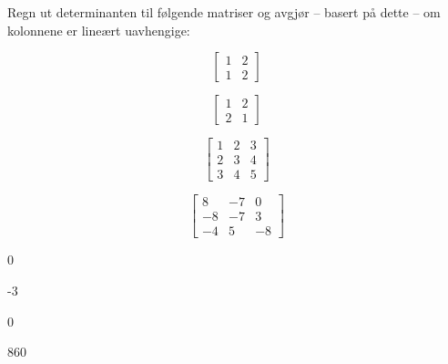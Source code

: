
\begin{oppgave}
Regn ut determinanten til følgende matriser og avgjør -- basert på dette -- om kolonnene er lineært uavhengige:
\begin{punkt}
$$\begin{bmatrix}
1 & 2\\
1 & 2
\end{bmatrix}$$
\end{punkt}

\begin{punkt}
$$\begin{bmatrix}
1 & 2\\
2 & 1
\end{bmatrix}$$
\end{punkt}

\begin{punkt}
$$\begin{bmatrix}
1 & 2 & 3\\
2 & 3 & 4\\
3 & 4 & 5
\end{bmatrix}$$
\end{punkt}

\begin{punkt}
$$\begin{bmatrix}
8 & -7 & 0\\
-8 & -7 & 3\\
-4 & 5 & -8
\end{bmatrix}$$
\end{punkt}

\end{oppgave}

\begin{losning}

\begin{punkt}
0
\end{punkt}

\begin{punkt}
-3
\end{punkt}

\begin{punkt}
0
\end{punkt}

\begin{punkt}
860
\end{punkt}

\end{losning}


